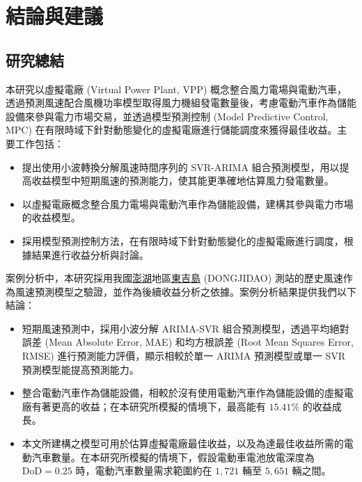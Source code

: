 
\chapter{結論與建議}

\section{研究總結}

本研究以虛擬電廠 (Virtual Power Plant, VPP) 概念整合風力電場與電動汽車，透過預測風速配合風機功率模型取得風力機組發電數量後，考慮電動汽車作為儲能設備來參與電力市場交易，並透過模型預測控制 (Model Predictive Control, MPC) 在有限時域下針對動態變化的虛擬電廠進行儲能調度來獲得最佳收益。主要工作包括：

\begin{itemize}
  \item 提出使用小波轉換分解風速時間序列的 SVR-ARIMA 組合預測模型，用以提高收益模型中短期風速的預測能力，使其能更準確地估算風力發電數量。
  \item 以虛擬電廠概念整合風力電場與電動汽車作為儲能設備，建構其參與電力市場的收益模型。
  \item 採用模型預測控制方法，在有限時域下針對動態變化的虛擬電廠進行調度，根據結果進行收益分析與討論。
\end{itemize}

案例分析中，本研究採用我國\uline{澎湖}地區\uline{東吉島} (DONGJIDAO) 測站的歷史風速作為風速預測模型之驗證，並作為後續收益分析之依據。案例分析結果提供我們以下結論：

\begin{itemize}
  \item 短期風速預測中，採用小波分解 ARIMA-SVR 組合預測模型，透過平均絕對誤差 (Mean Absolute Error, MAE) 和均方根誤差 (Root Mean Squares Error, RMSE) 進行預測能力評價，顯示相較於單一 ARIMA 預測模型或單一 SVR 預測模型能提高預測能力。
  \item 整合電動汽車作為儲能設備，相較於沒有使用電動汽車作為儲能設備的虛擬電廠有著更高的收益；在本研究所模擬的情境下，最高能有 $15.41\%$ 的收益成長。
  \item 本文所建構之模型可用於估算虛擬電廠最佳收益，以及為達最佳收益所需的電動汽車數量。在本研究所模擬的情境下，假設電動車電池放電深度為 $\text{DoD}=0.25$ 時，電動汽車數量需求範圍約在 $1,721$ 輛至 $5,651$ 輛之間。
\end{itemize}

